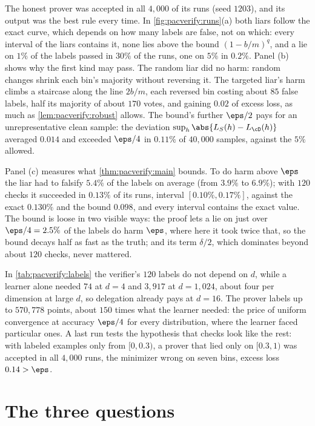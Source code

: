 \begin{refsection}
The honest prover was accepted in all $4{,}000$ of its runs (seed $1203$), and its output was the best rule every time. In \cref{fig:pacverify:runs}(a) both liars follow the exact curve, which depends on how many labels are false, not on which: every interval of the liars contains it, none lies above the bound $(1-b/m)^q$, and a lie on $1\%$ of the labels passed in $30\%$ of the runs, one on $5\%$ in $0.2\%$. Panel (b) shows why the first kind may pass. The random liar did no harm: random changes shrink each bin's majority without reversing it. The targeted liar's harm climbs a staircase along the line $2b/m$, each reversed bin costing about $85$ false labels, half its majority of about $170$ votes, and gaining $0.02$ of excess loss, as much as \cref{lem:pacverify:robust} allows. The bound's further $\eps/2$ pays for an unrepresentative clean sample: the deviation $\sup_h\abs{L_S(h)-L_\cD(h)}$ averaged $0.014$ and exceeded $\eps/4$ in $0.11\%$ of $40{,}000$ samples, against the $5\%$ allowed.

Panel (c) measures what \cref{thm:pacverify:main} bounds. To do harm above $\eps$ the liar had to falsify $5.4\%$ of the labels on average (from $3.9\%$ to $6.9\%$); with $120$ checks it succeeded in $0.13\%$ of its runs, interval $[0.10\%,0.17\%]$, against the exact $0.130\%$ and the bound $0.098$, and every interval contains the exact value. The bound is loose in two visible ways: the proof lets a lie on just over $\eps/4=2.5\%$ of the labels do harm $\eps$, where here it took twice that, so the bound decays half as fast as the truth; and its term $\delta/2$, which dominates beyond about $120$ checks, never mattered.

In \cref{tab:pacverify:labels} the verifier's $120$ labels do not depend on $d$, while a learner alone needed $74$ at $d=4$ and $3{,}917$ at $d=1{,}024$, about four per dimension at large $d$, so delegation already pays at $d=16$. The prover labels up to $570{,}778$ points, about $150$ times what the learner needed: the price of uniform convergence at accuracy $\eps/4$ for every distribution, where the learner faced particular ones. A last run tests the hypothesis that checks look like the rest: with labeled examples only from $[0,0.3)$, a prover that lied only on $[0.3,1)$ was accepted in all $4{,}000$ runs, the minimizer wrong on seven bins, excess loss $0.14>\eps$.

\section{The three questions}\label{sec:pacverify:questions}


\end{refsection}
